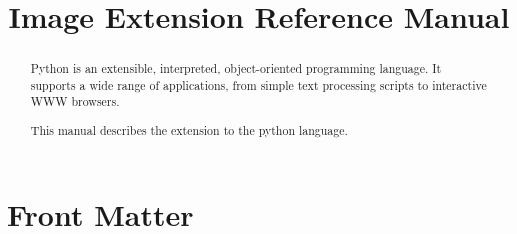 \documentclass{manual}
\title{Image Extension Reference Manual}
\begin{document}
\maketitle

\ifhtml
\chapter*{Front Matter\label{front}}
\fi



\begin{abstract}

\noindent
Python is an extensible, interpreted, object-oriented programming
language.  It supports a wide range of applications, from simple text
processing scripts to interactive WWW browsers.

This manual describes the  extension to the python language.
\end{abstract}

\tableofcontents



\end{document}
